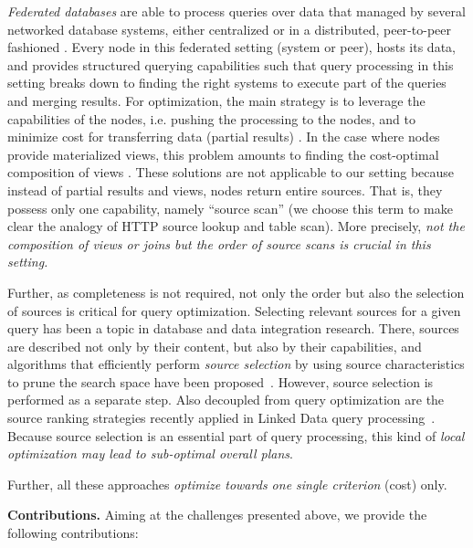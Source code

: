 \emph{Federated databases} are able to process queries over data that
managed by several networked database systems, either centralized
\cite{} or in a distributed, peer-to-peer fashioned \cite{}. Every
node in this federated setting (system or peer), hosts its data, and
provides structured querying capabilities such that query processing
in this setting breaks down to finding the right systems to execute
part of the queries and merging results. For optimization, the main
strategy is to leverage the capabilities of the nodes, i.e. pushing
the processing to the nodes, and to minimize cost for transferring
data (partial results) \cite{}. In the case where nodes provide
materialized views, this problem amounts to finding the cost-optimal
composition of views \cite{pottinger_minicon:_2001}. These solutions
are not applicable to our setting because instead of partial results
and views, nodes return entire sources. That is, they possess only one
capability, namely ``source scan'' (we choose this term to make clear
the analogy of HTTP source lookup and table scan). More precisely,
\emph{not the composition of views or joins but the order of source
  scans is crucial in this setting.} 

Further, as completeness is not required, not only the order but also
the selection of sources is critical for query optimization. Selecting
relevant sources for a given query has been a topic in database and
data integration research. There, sources are described not only by
their content, but also by their capabilities, and algorithms that
efficiently perform \emph{source selection} by using source
characteristics to prune the search space have been
proposed~\cite{levy_querying_1996}. However, source selection is
performed as a separate step. Also decoupled from query optimization
are the source ranking strategies recently applied in Linked Data
query processing~\cite{harth_data_2010,ladwig_linked_2010}. Because
source selection is an essential part of query processing, this kind
of \emph{local optimization may lead to sub-optimal overall plans}.


Further, all these approaches \emph{optimize towards one single
  criterion} (cost) only.

\textbf{Contributions.} Aiming at the challenges presented above, we
provide the following contributions:


